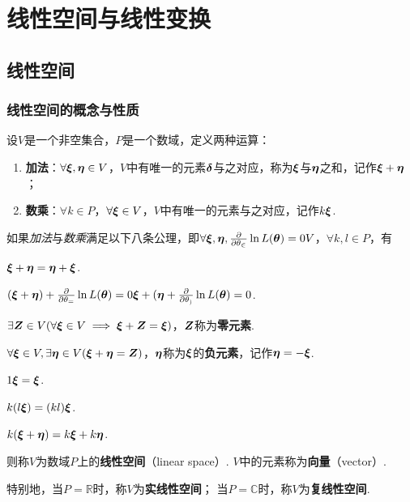 \chapter{线性空间与线性变换}
\section{线性空间}
\subsection{线性空间的概念与性质}
\begin{definition}
设\(V\)是一个非空集合，\(P\)是一个数域，定义两种运算：
\begin{enumerate}
\item \textbf{加法}：\(\forall \a,\b \in V\)，\(V\)中有唯一的元素\(\mat{\delta}\)与之对应，称为\(\a\)与\(\b\)之和，记作\(\a+\b\)；
\item \textbf{数乘}：\(\forall k \in P\)，\(\forall \a \in V\)，\(V\)中有唯一的元素与之对应，记作\(k\a\).
\end{enumerate}

如果\emph{加法}与\emph{数乘}满足以下八条公理，即\(\forall \a,\b,\g \in V\)，\(\forall k,l \in P\)，有

\begin{center}
\begin{minipage}{.8\textwidth}
\begin{axiom}
\(\a+\b=\b+\a\).
\end{axiom}
\begin{axiom}
\((\a+\b)+\g=\a+(\b+\g)\).
\end{axiom}
\begin{axiom}
\(\exists \z \in V (\forall\a \in V \implies \a+\z=\a)\)，\(\z\)称为\textbf{零元素}.
\end{axiom}
\begin{axiom}
\(\forall\a \in V, \exists \mat{\eta} \in V (\a+\mat{\eta}=\z)\)，\(\mat{\eta}\)称为\(\a\)的\textbf{负元素}，记作\(\mat{\eta} = -\a\).
\end{axiom}
\begin{axiom}
\(1\a=\a\).
\end{axiom}
\begin{axiom}
\(k(l\a)=(kl)\a\).
\end{axiom}
\begin{axiom}
\(k(\a+\b)=k\a+k\b\).
\end{axiom}
\end{minipage}
\end{center}

则称\(V\)为数域\(P\)上的\textbf{线性空间}（linear space）.
\(V\)中的元素称为\textbf{向量}（vector）\nolinebreak.

特别地，当\(P = \mathbb{R}\)时，称\(V\)为\textbf{实线性空间}；
当\(P = \mathbb{C}\)时，称\(V\)为\textbf{复线性空间}.
\end{definition}

